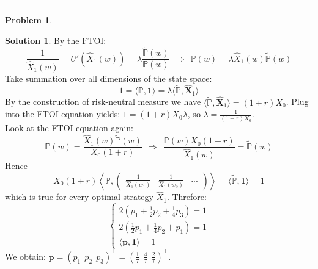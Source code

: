 \documentclass[a4paper, 10pt]{article}
\theoremstyle{definition}
\newtheorem{problem}{Problem}
\theoremstyle{hSol}
\newtheorem*{solution}{Solution}
\begin{document}
\noindent\rule{16cm}{0.4pt}
\begin{problem} 
\end{problem}
\begin{solution} By the FTOI:
\begin{equation}
	\frac{1}{\hat{X}_1(w)}= U'(\hat{X}_1(w)) = \lambda \frac{\tilde{\mathbb{P}}(w)}{\mathbb{P}(w)} ~~\Rightarrow~~\mathbb{P}\left(w\right) = \lambda \hat{X}_1(w) \tilde{\mathbb{P}}(w)
\end{equation}
Take summation over all dimensions of the state space:
\begin{equation}
	1 = \langle \mathbb{P}, \bm{1} \rangle = \lambda \langle \tilde{\mathbb{P}}, \hat{\bm{X}}_1 \rangle
\end{equation}
By the construction of risk-neutral measure we have $\langle \tilde{\mathbb{P}}, \hat{\bm{X}}_1 \rangle = (1+r)X_0$. Plug into the FTOI equation yields: $1 = (1+r)X_0 \lambda$, so $\lambda = \tfrac{1}{(1+r)X_0}$. \\
Look at the FTOI equation again:
\begin{equation}
	\mathbb{P}\left(w\right) = \frac{\hat{X}_1(w) \tilde{\mathbb{P}}(w)}{X_0(1+r)}~~\Rightarrow~~\frac{\mathbb{P}(w)X_0(1+r)}{\hat{X}_1(w)} = \tilde{\mathbb{P}}(w)
\end{equation}
Hence
\begin{equation}
	X_0(1+r)\left\langle \mathbb{P}, \begin{pmatrix}
		\frac{1}{\hat{X}_1(w_1)} & \frac{1}{\hat{X}_1(w_2)} & ...
	\end{pmatrix}\right\rangle = \langle \tilde{\mathbb{P}}, \bm{1} \rangle = 1
\end{equation}
which is true for every optimal strategy $\hat{X}_1$. Threfore:
\begin{equation}
	\begin{cases}
	2\left(p_1 + \frac{1}{2}p_2 + \frac{1}{4}p_3\right) = 1\\
	2\left(\frac{1}{2}p_1 + \frac{1}{4}p_2 + p_1\right) = 1 \\
	\langle \bm{p}, \bm{1} \rangle = 1
	\end{cases}
\end{equation}
We obtain: $\bm{p} = (p_1~~p_2~~p_3)^{\top} = (\tfrac{1}{7}~~\tfrac{4}{7}~~\tfrac{2}{7})^{\top}$.
\end{solution}
\end{document}
